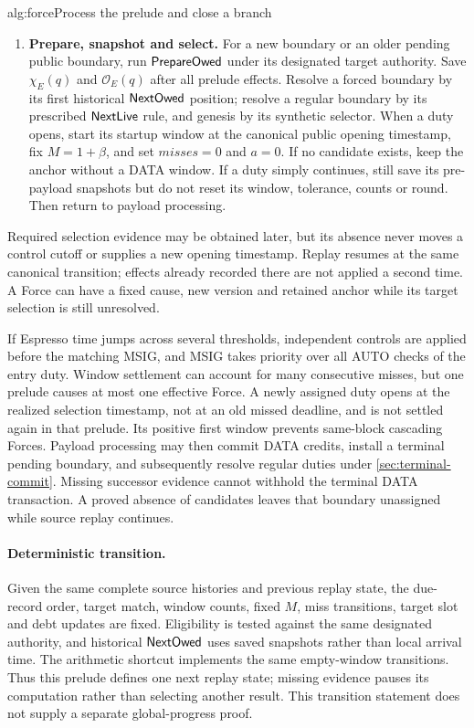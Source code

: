 \begin{protocol}{alg:force}{Process the prelude and close a branch}
\begin{enumerate}[label=\textbf{\arabic*)},itemsep=3pt]
\item \textbf{Prepare, snapshot and select.} For a new boundary or
an older pending public boundary, run $\mathsf{PrepareOwed}$ under its
designated target authority. Save $\chi_E(q)$ and
$\mathcal O_E(q)$ after all prelude effects. Resolve a forced boundary
by its first historical $\mathsf{NextOwed}$ position; resolve a regular
boundary by its prescribed $\mathsf{NextLive}$ rule, and genesis by its
synthetic selector. When a duty opens,
start its startup window at the canonical public opening timestamp,
fix $M=1+\beta$, and set $\mathit{misses}=0$ and $a=0$. If no candidate
exists, keep the anchor without a DATA window. If a duty simply
continues, still save its pre-payload snapshots but do not reset its
window, tolerance, counts or round. Then return to payload processing.
\end{enumerate}
\end{protocol}

Required selection evidence may be obtained later, but its absence
never moves a control cutoff or supplies a new opening timestamp.
Replay resumes at the same canonical transition; effects already
recorded there are not applied a second time. A Force can have a fixed
cause, new version and retained anchor while its target selection is
still unresolved.

If Espresso time jumps across several thresholds, independent
controls are applied before the matching MSIG, and MSIG takes priority
over all AUTO checks of the entry duty. Window settlement can account
for many consecutive misses, but one prelude causes at most one
effective Force. A newly assigned duty opens at the realized selection
timestamp, not at an old missed deadline, and is not settled again in
that prelude. Its positive first window prevents same-block cascading
Forces. Payload processing may then commit DATA credits, install a terminal
pending boundary, and subsequently resolve regular duties under
\cref{sec:terminal-commit}. Missing successor evidence cannot withhold
the terminal DATA transaction. A proved absence of candidates leaves
that boundary unassigned while source replay continues.

\paragraph{Deterministic transition.}
Given the same complete source histories and previous replay state,
the due-record order, target match, window counts, fixed $M$, miss
transitions, target slot and debt updates are fixed. Eligibility is
tested against the same designated authority, and historical
$\mathsf{NextOwed}$ uses saved snapshots rather than local arrival time.
The arithmetic shortcut implements the same empty-window transitions.
Thus this prelude defines one next replay state; missing evidence
pauses its computation rather than selecting another result. This
transition statement does not supply a separate global-progress proof.

